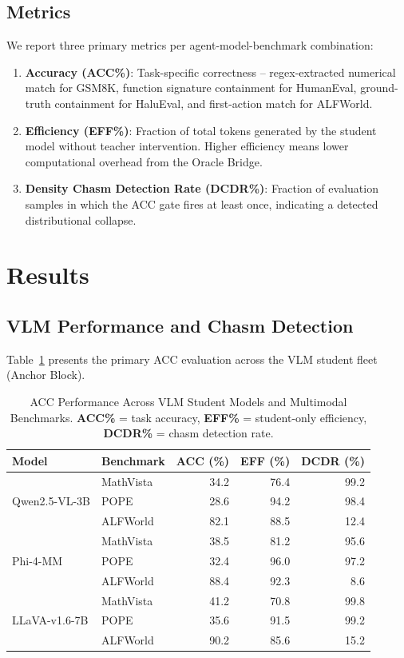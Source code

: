 \documentclass[runningheads]{article} %
\begin{document}
\subsection{Metrics}
We report three primary metrics per agent-model-benchmark combination:
\begin{enumerate}
  \item \textbf{Accuracy (ACC\%)}: Task-specific correctness -- regex-extracted numerical match for GSM8K, function signature containment for HumanEval, ground-truth containment for HaluEval, and first-action match for ALFWorld.
  \item \textbf{Efficiency (EFF\%)}: Fraction of total tokens generated by the student model without teacher intervention. Higher efficiency means lower computational overhead from the Oracle Bridge.
  \item \textbf{Density Chasm Detection Rate (DCDR\%)}: Fraction of evaluation samples in which the ACC gate fires at least once, indicating a detected distributional collapse.
\end{enumerate}

\section{Results}
\label{sec:results}

\subsection{VLM Performance and Chasm Detection}
Table~\ref{tab:main_results} presents the primary ACC evaluation across the VLM student fleet (Anchor Block).

\begin{table}[t]
\centering
\caption{ACC Performance Across VLM Student Models and Multimodal Benchmarks.
\textbf{ACC\%} = task accuracy, \textbf{EFF\%} = student-only efficiency,
\textbf{DCDR\%} = chasm detection rate.}
\label{tab:main_results}
\footnotesize
\begin{tabular}{@{}llrrr@{}}
\toprule
\textbf{Model} & \textbf{Benchmark} & \textbf{ACC (\%)} & \textbf{EFF (\%)} & \textbf{DCDR (\%)} \\
\midrule
\multirow{3}{*}{Qwen2.5-VL-3B}
 & MathVista  & 34.2 & 76.4 & 99.2 \\
 & POPE       & 28.6 & 94.2 & 98.4 \\
 & ALFWorld   & 82.1 & 88.5 & 12.4 \\
\midrule
\multirow{3}{*}{Phi-4-MM}
 & MathVista  & 38.5 & 81.2 & 95.6 \\
 & POPE       & 32.4 & 96.0 & 97.2 \\
 & ALFWorld   & 88.4 & 92.3 & 8.6 \\
\midrule
\multirow{3}{*}{LLaVA-v1.6-7B}
 & MathVista  & 41.2 & 70.8 & 99.8 \\
 & POPE       & 35.6 & 91.5 & 99.2 \\
 & ALFWorld   & 90.2 & 85.6 & 15.2 \\
\bottomrule
\end{tabular}
\end{table}
\end{document}
